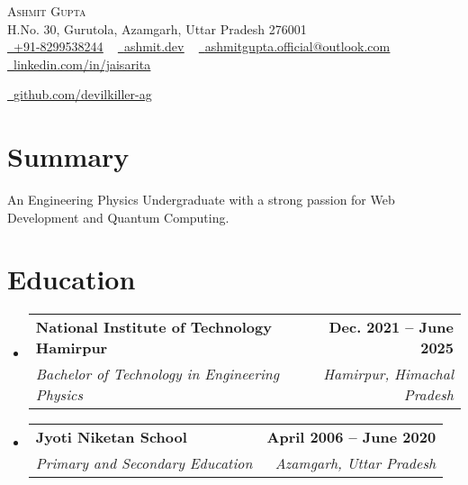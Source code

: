 \documentclass[letterpaper,11pt]{article}
\makeatletter
\newcommand{\resumeSubheading}[4]{
  \vspace{-2pt}\item
    \begin{tabular*}{1.0\textwidth}[t]{l@{\extracolsep{\fill}}r}
      \textbf{#1} & \textbf{\small #2} \\
      \textit{\small#3} & \textit{\small #4} \\
    \end{tabular*}\vspace{-7pt}
}
\newcommand{\resumeSubHeadingListStart}{\begin{itemize}[leftmargin=0.0in, label={}]}
\newcommand{\resumeSubHeadingListEnd}{\end{itemize}}
\makeatother
\begin{document}
\vspace*{1pt}

\begin{center}
    {\Huge \scshape Ashmit Gupta} \\ \vspace{1pt}
    H.No. 30, Gurutola, Azamgarh, Uttar Pradesh 276001 \\ \vspace{1pt}
    \href{tel:+91-8299538244}{\raisebox{-0.2\height}\faPhone\  \underline{+91-8299538244}} ~
    \href{https://www.ashmit.dev}{\raisebox{-0.2\height}\faGlobe\ 
    \underline{ashmit.dev}} ~
    \href{mailto:ashmitgupta.official@outlook.com}{\raisebox{-0.2\height}\faEnvelope\  \underline{ashmitgupta.official@outlook.com}} ~ 
    \href{https://www.linkedin.com/in/jaisarita/}{\raisebox{-0.2\height}\faLinkedin\ \underline{linkedin.com/in/jaisarita}}  ~
    
    \href{https://github.com/devilkiller-ag}{\raisebox{-0.2\height}\faGithub\ \underline{github.com/devilkiller-ag}}
    \vspace{-8pt}
\end{center}

\vspace{6pt}

\section{Summary}
    An Engineering Physics Undergraduate with a strong passion for Web Development and Quantum Computing.

\vspace*{-2pt}

\section{Education}
  \resumeSubHeadingListStart
    \resumeSubheading
      {National Institute of Technology Hamirpur}{Dec. 2021 -- June 2025}
      {Bachelor of Technology in Engineering Physics}{Hamirpur, Himachal Pradesh}
    \resumeSubheading
      {Jyoti Niketan School}{April 2006 -- June 2020}
      {Primary and Secondary Education}{Azamgarh, Uttar Pradesh}
  \resumeSubHeadingListEnd

\vspace*{-2pt}

\end{document}
